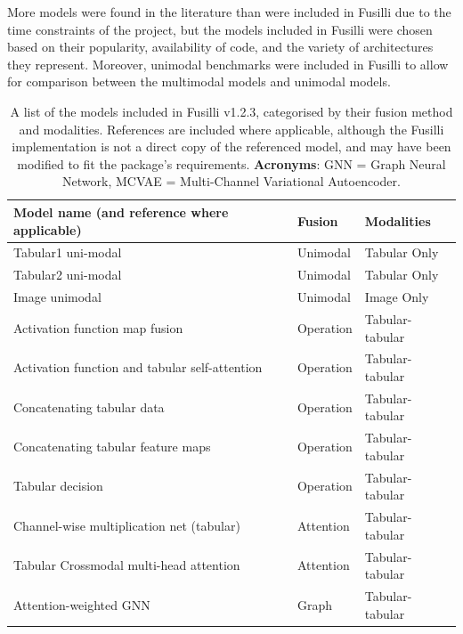 More models were found in the literature than were included in Fusilli due to the time constraints of the project, but the models included in Fusilli were chosen based on their popularity, availability of code, and the variety of architectures they represent.
Moreover, unimodal benchmarks were included in Fusilli to allow for comparison between the multimodal models and unimodal models.

\begin{table}[!ht]
    \caption{A list of the models included in Fusilli v1.2.3, categorised by their fusion method and modalities.
    References are included where applicable, although the Fusilli implementation is not a direct copy of the referenced model, and may have been modified to fit the package's requirements.
    \textbf{Acronyms}: GNN = Graph Neural Network, MCVAE = Multi-Channel Variational Autoencoder.}
    \label{}
    \centering
    \begin{tabular}{|p{8cm}ll|}
        \hline
        \textbf{Model name (and reference where applicable)} & \textbf{Fusion} & \textbf{Modalities} \\ \hline
        Tabular1 uni-modal & Unimodal & Tabular Only \\ \hline
        Tabular2 uni-modal & Unimodal & Tabular Only \\ \hline
        Image unimodal & Unimodal & Image Only \\ \hline
        Activation function map fusion~\cite{chenMDFNetApplicationMultimodal2023} & Operation & Tabular-tabular \\ \hline
        Activation function and tabular self-attention~\cite{chenMDFNetApplicationMultimodal2023} & Operation & Tabular-tabular \\ \hline
        Concatenating tabular data & Operation & Tabular-tabular \\ \hline 
        Concatenating tabular feature maps~\cite{gaoReducingUncertaintyCancer2022} & Operation & Tabular-tabular \\ \hline
        Tabular decision & Operation & Tabular-tabular \\ \hline 
        Channel-wise multiplication net (tabular)~\cite{duanmuPredictionPathologicalComplete2020}  & Attention & Tabular-tabular \\ \hline
        Tabular Crossmodal multi-head attention~\cite{golovanevskyMultimodalAttentionbasedDeep2022}  & Attention & Tabular-tabular \\ \hline
        Attention-weighted GNN~\cite{bintsiMultimodalBrainAge2023} & Graph & Tabular-tabular \\ \hline

\end{tabular}
\end{table}
